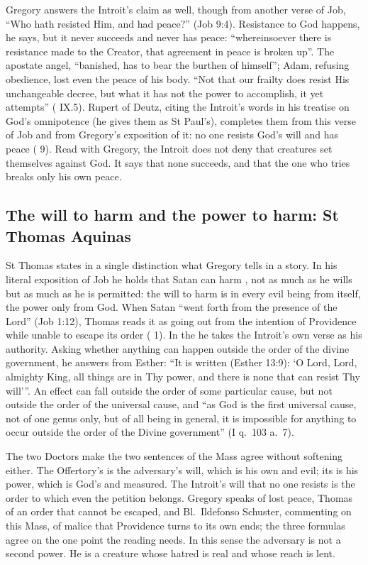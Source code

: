 Gregory answers the Introit's claim as well, though from another verse of Job,
``Who hath resisted Him, and had peace?'' (Job 9:4). Resistance to God happens,
he says, but it never succeeds and never has peace: ``whereinsoever there is
resistance made to the Creator, that agreement in peace is broken up''. The
apostate angel, ``banished, has to bear the burthen of himself''; Adam, refusing
obedience, lost even the peace of his body. ``Not that our frailty does resist
His unchangeable decree, but what it has not the power to accomplish, it yet
attempts'' ( IX.5). Rupert of Deutz, citing the Introit's words
in his treatise on God's omnipotence (he gives them as St Paul's), completes them
from this verse of Job and from Gregory's exposition of it: no one resists God's
will and has peace ( 9). Read with Gregory, the
Introit does not deny that creatures set themselves against God. It says that
none succeeds, and that the one who tries breaks only his own peace.

\subsection{The will to harm and the power to harm: St Thomas Aquinas}

St Thomas states in a single distinction what Gregory tells in a story. In his
literal exposition of Job he holds that Satan can harm , not as much as he wills but as much as he is permitted:
the will to harm is in every evil being from itself, the power only from God.
When Satan ``went forth from the presence of the Lord'' (Job 1:12), Thomas reads
it as going out from the intention of Providence while unable to escape its
order ( 1). In the  he takes the Introit's
own verse as his authority. Asking whether anything can happen outside the order
of the divine government, he answers from Esther: ``It is written (Esther 13:9):
`O Lord, Lord, almighty King, all things are in Thy power, and there is none that
can resist Thy will'''. An effect can fall outside the order of some particular
cause, but not outside the order of the universal cause, and ``as God is the
first universal cause, not of one genus only, but of all being in general, it is
impossible for anything to occur outside the order of the Divine government''
(I q.~103 a.~7).

The two Doctors make the two sentences of the Mass agree without softening
either. The Offertory's  is the adversary's will, which is his own
and evil; its  is his power, which is God's and
measured. The Introit's will that no one resists is the order to which even the
petition belongs. Gregory speaks of lost peace, Thomas of an order that cannot be
escaped, and Bl.\ Ildefonso Schuster, commenting on this Mass, of malice that
Providence turns to its own ends; the three formulas agree on the one point the
reading needs. In this sense the adversary is not a second power. He is a
creature whose hatred is real and whose reach is lent.

